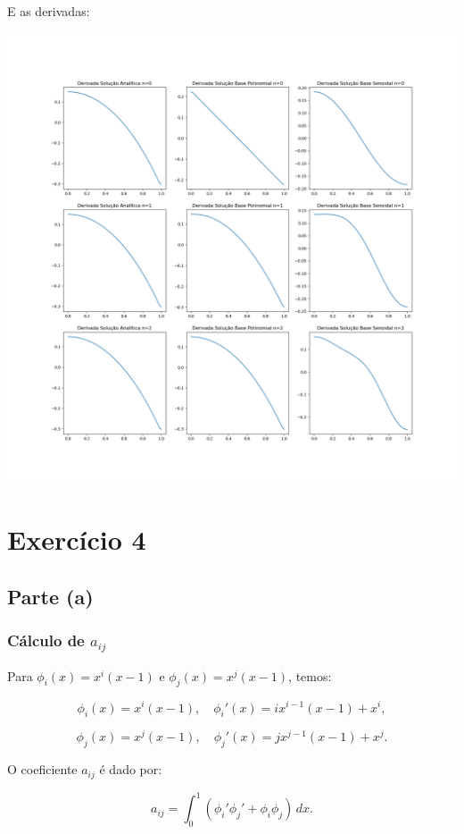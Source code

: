 \documentclass{article}
\begin{document}
E as derivadas:
\begin{center}
    \includegraphics[width=1\textwidth]{exercicio123_derivadas_solucao.png}
\end{center}


\section{Exercício 4}


\subsection{Parte (a)}

\subsubsection{Cálculo de \( a_{ij} \)}

Para \( \phi_i(x) = x^i(x-1) \) e \( \phi_j(x) = x^j(x-1) \), temos:

\[
\phi_i(x) = x^i (x-1), \quad \phi_i'(x) = ix^{i-1}(x-1) + x^i,
\]

\[
\phi_j(x) = x^j (x-1), \quad \phi_j'(x) = jx^{j-1}(x-1) + x^j.
\]

O coeficiente \( a_{ij} \) é dado por:

\[
a_{ij} = \int_0^1 (\phi_i' \phi_j' + \phi_i \phi_j) \, dx.
\]
\end{document}
